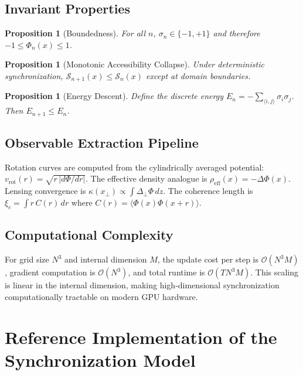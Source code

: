 \documentclass[11pt, a4paper, twocolumn]{article}
\newtheorem{proposition}[definition]{Proposition}
\newcommand{\Sfield}{\mathcal{S}}
\begin{document}
{\subsection{Invariant Properties}

\begin{proposition}[Boundedness]
For all $n$, $\sigma_n \in \{-1,+1\}$ and therefore
$-1 \leq \Phi_n(x) \leq 1$.
\end{proposition}

\begin{proposition}[Monotonic Accessibility Collapse]
Under deterministic synchronization, $\Sfield_{n+1}(x) \leq \Sfield_n(x)$
except at domain boundaries.
\end{proposition}

\begin{proposition}[Energy Descent]
Define the discrete energy $E_n = -\sum_{\langle i,j\rangle}\sigma_i\sigma_j$.
Then $E_{n+1} \leq E_n$.
\end{proposition}

\subsection{Observable Extraction Pipeline}

Rotation curves are computed from the cylindrically averaged potential:
$v_{\mathrm{rot}}(r) = \sqrt{r\,|d\Phi/dr|}$.
The effective density analogue is $\rho_{\mathrm{eff}}(x) = -\Delta\Phi(x)$.
Lensing convergence is $\kappa(x_\perp) \propto \int\Delta_\perp\Phi\,dz$.
The coherence length is $\xi_c = \int r\,C(r)\,dr$ where
$C(r) = \langle\Phi(x)\Phi(x+r)\rangle$.

\subsection{Computational Complexity}

For grid size $N^3$ and internal dimension $M$, the update cost per step is
$\mathcal{O}(N^3 M)$, gradient computation is $\mathcal{O}(N^3)$, and total
runtime is $\mathcal{O}(T N^3 M)$. This scaling is linear in the internal
dimension, making high-dimensional synchronization computationally tractable
on modern GPU hardware.

\section{Reference Implementation of the Synchronization Model}

}
\end{document}
